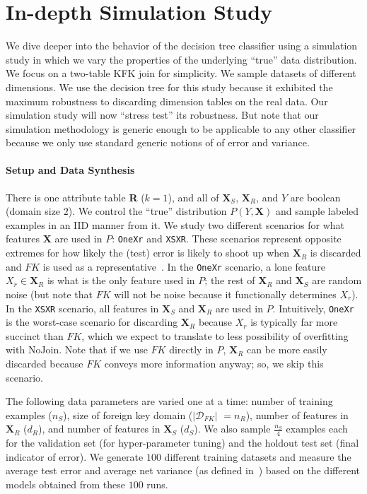 \documentclass[sigconf]{acmart}
\begin{document}
\section{In-depth Simulation Study}

We dive deeper into the behavior of the decision tree classifier using a simulation study in which we vary the properties of the 
underlying ``true'' data distribution. We focus on a two-table KFK join for simplicity. We sample datasets of different dimensions.
We use the decision tree for this study because it exhibited the maximum robustness to discarding dimension tables on the real data. 
Our simulation study will now ``stress test'' its robustness.
But note that our simulation methodology is generic enough to be applicable to any other classifier because we only use 
standard generic notions of of error and variance.

\vspace{-1mm}
\paragraph*{\textbf{Setup and Data Synthesis}}
There is one attribute table \textbf{R} ($k=1$), and all of $\textbf{X}_S$, $\textbf{X}_R$, and $Y$ are boolean (domain size $2$).
We control the ``true'' distribution $P(Y,\textbf{X})$ and sample labeled examples in an IID manner from it.
We study two different scenarios for what features \textbf{X} are used in $P$: \texttt{OneXr} and \texttt{XSXR}.
These scenarios represent opposite extremes for how likely the (test) error is likely to shoot up when $\textbf{X}_R$ is discarded
and $FK$ is used as a representative~\cite{hamlet}. In the \texttt{OneXr} scenario, a lone feature $X_r \in \textbf{X}_R$ is 
what is the only feature used in $P$; the rest of $\textbf{X}_R$ and $\textbf{X}_S$ are random noise (but note that $FK$ will not 
be noise because it functionally determines $X_r$). In the \texttt{XSXR} scenario, all features in $\textbf{X}_S$ and $\textbf{X}_R$
are used in $P$. Intuitively, \texttt{OneXr} is the worst-case scenario for discarding $\textbf{X}_R$ because $X_r$ is typically 
far more succinct than $FK$, which we expect to translate to less possibility of overfitting with NoJoin. Note that if we use $FK$ 
directly in $P$, $\textbf{X}_R$ can be more easily discarded because $FK$ conveys more information anyway; so, we skip this scenario.

The following data parameters are varied one at a time: number of training examples ($n_S$), size of foreign key domain ($|\mathcal{D}_{FK}|$ $=n_R$),
number of features in $\textbf{X}_R$ ($d_R$), and number of features in $\textbf{X}_S$ ($d_S$). We also sample $\frac{n_S}{4}$ examples each for the 
validation set (for hyper-parameter tuning) and the holdout test set (final indicator of error).
We generate $100$ different training datasets and measure the average test error and average net variance (as defined in~\cite{pedrobvd}) 
based on the different models obtained from these $100$ runs.
\end{document}
